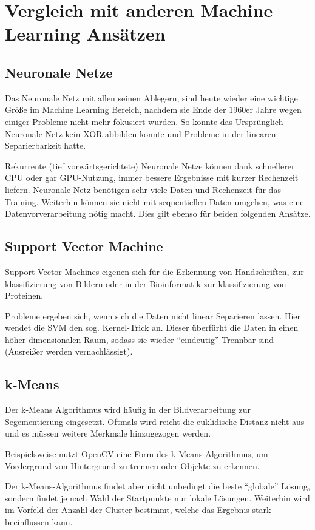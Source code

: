\chapter{Vergleich mit anderen Machine Learning Ansätzen}  \label{mainsec:comp}

\section{Neuronale Netze} \label{sec:neuron}
Das Neuronale Netz mit allen seinen Ablegern, sind heute wieder eine wichtige Größe im Machine Learning Bereich, nachdem sie Ende der 1960er Jahre wegen einiger Probleme nicht mehr fokusiert wurden. So konnte das Ursprünglich Neuronale Netz kein XOR abbilden konnte und Probleme in der linearen Separierbarkeit hatte.

Rekurrente (tief vorwärtsgerichtete) Neuronale Netze können dank schnellerer CPU oder gar GPU-Nutzung, immer bessere Ergebnisse mit kurzer Rechenzeit liefern. 
Neuronale Netz benötigen sehr viele Daten und Rechenzeit für das Training. Weiterhin können sie nicht mit sequentiellen Daten umgehen, was eine Datenvorverarbeitung nötig macht. Dies gilt ebenso für beiden folgenden Ansätze.


\section{Support Vector Machine} \label{sec:svm}
Support Vector Machines eigenen sich für die Erkennung von Handschriften, zur klassifizierung von Bildern oder in der Bioinformatik zur klassifizierung von Proteinen.

Probleme ergeben sich, wenn sich die Daten nicht linear Separieren lassen. Hier wendet die SVM den sog. Kernel-Trick an. Dieser überfürht die Daten in einen höher-dimensionalen Raum, sodass sie wieder ``eindeutig'' Trennbar sind (Ausreißer werden vernachlässigt).


\section{k-Means} \label{sec:kmeans}
Der k-Means Algorithmus wird häufig in der Bildverarbeitung zur Segementierung eingesetzt. Oftmals wird reicht die euklidische Distanz nicht aus und es müssen weitere Merkmale hinzugezogen werden.

Beispielsweise nutzt OpenCV eine Form des k-Means-Algorithmus, um Vordergrund von Hintergrund zu trennen oder Objekte zu erkennen.

Der k-Means-Algorithmus findet aber nicht unbedingt die beste ``globale'' Lösung, sondern findet je nach Wahl der Startpunkte nur lokale Lösungen. Weiterhin wird im Vorfeld der Anzahl der Cluster bestimmt, welche das  Ergebnis stark beeinflussen kann.